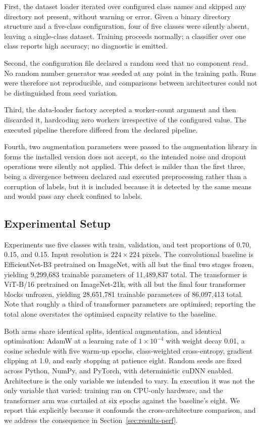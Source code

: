 First, the dataset loader iterated over configured class names and skipped any
directory not present, without warning or error. Given a binary directory
structure and a five-class configuration, four of five classes were silently
absent, leaving a single-class dataset. Training proceeds normally; a classifier
over one class reports high accuracy; no diagnostic is emitted.

Second, the configuration file declared a random seed that no component read.
No random number generator was seeded at any point in the training path. Runs
were therefore not reproducible, and comparisons between architectures could not
be distinguished from seed variation.

Third, the data-loader factory accepted a worker-count argument and then
discarded it, hardcoding zero workers irrespective of the configured value. The
executed pipeline therefore differed from the declared pipeline.

Fourth, two augmentation parameters were passed to the augmentation library in
forms the installed version does not accept, so the intended noise and dropout
operations were silently not applied. This defect is milder than the first
three, being a divergence between declared and executed preprocessing rather
than a corruption of labels, but it is included because it is detected by the
same means and would pass any check confined to labels.

\subsection{Experimental Setup}

Experiments use five classes with train, validation, and test proportions of
0.70, 0.15, and 0.15. Input resolution is $224\times224$ pixels. The
convolutional baseline is EfficientNet-B3 \cite{b19} pretrained on ImageNet,
with all but the final two stages frozen, yielding 9,299,683 trainable
parameters of 11,489,837 total. The transformer is ViT-B/16 \cite{b12}
pretrained on ImageNet-21k, with all but the final four transformer blocks
unfrozen, yielding 28,651,781 trainable parameters of 86,097,413 total. Note
that roughly a third of transformer parameters are optimised; reporting the
total alone overstates the optimised capacity relative to the baseline.

Both arms share identical splits, identical augmentation, and identical
optimisation: AdamW at a learning rate of $1\times10^{-4}$ with weight decay
0.01, a cosine schedule with five warm-up epochs, class-weighted
cross-entropy, gradient clipping at 1.0, and early stopping at patience eight.
Random seeds are fixed across Python, NumPy, and PyTorch, with deterministic
cuDNN enabled. Architecture is the only variable we intended to vary. In
execution it was not the only variable that varied: training ran on CPU-only
hardware, and the transformer arm was curtailed at six epochs against the
baseline's eight. We report this explicitly because it confounds the
cross-architecture comparison, and we address the consequence in
Section~\ref{sec:results-perf}.

